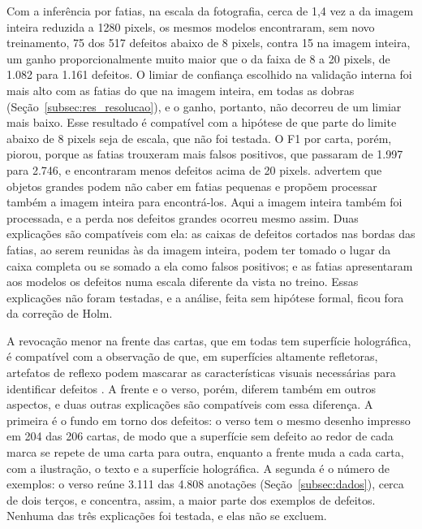 \documentclass[
    12pt,                %
    openright,           %
    oneside,             %
    a4paper,             %
    english,             %
    brazil               %
]{abntex2}
\begin{document}
Com a inferência por fatias, na escala da fotografia, cerca de 1,4 vez
a da imagem inteira reduzida a 1280 pixels, os mesmos modelos
encontraram, sem novo treinamento, 75 dos 517 defeitos abaixo de 8
pixels, contra 15 na imagem inteira, um ganho proporcionalmente muito
maior que o da faixa de 8 a 20 pixels, de 1.082 para 1.161 defeitos. O
limiar de confiança escolhido na validação interna foi mais alto com as
fatias do que na imagem inteira, em todas as dobras
(Seção~\ref{subsec:res_resolucao}), e o ganho, portanto, não decorreu
de um limiar mais baixo. Esse resultado é compatível com a hipótese de
que parte do limite abaixo de 8 pixels seja de escala, que não foi
testada. O F1 por carta, porém, piorou, porque as fatias trouxeram
mais falsos positivos, que passaram de 1.997 para 2.746, e encontraram
menos defeitos acima de 20 pixels.
 advertem que objetos grandes podem não caber em
fatias pequenas e propõem processar também a imagem inteira para
encontrá-los. Aqui a imagem inteira também foi processada, e a perda
nos defeitos grandes ocorreu mesmo assim. Duas explicações são
compatíveis com ela: as caixas de defeitos cortados nas bordas das
fatias, ao serem reunidas às da imagem inteira, podem ter tomado o
lugar da caixa completa ou se somado a ela como falsos positivos; e as
fatias apresentaram aos modelos os defeitos numa escala diferente da
vista no treino. Essas
explicações não foram testadas, e a análise, feita sem hipótese
formal, ficou fora da correção de Holm.

A revocação menor na frente das cartas, que em todas tem superfície
holográfica, é compatível com a observação de que, em superfícies
altamente refletoras, artefatos de reflexo podem mascarar as
características visuais necessárias para identificar defeitos
\cite{KimMG2026}. A frente e o verso, porém, diferem também em outros
aspectos, e duas outras explicações são compatíveis com essa
diferença. A primeira é o fundo em torno dos defeitos: o verso tem o
mesmo desenho impresso em 204 das 206 cartas, de modo que a superfície sem
defeito ao redor de cada marca se repete de uma carta para outra,
enquanto a frente muda a cada carta, com a ilustração, o texto e a
superfície holográfica. A segunda é o número de exemplos: o verso reúne
3.111 das 4.808 anotações (Seção~\ref{subsec:dados}), cerca de dois
terços, e concentra, assim, a maior parte dos exemplos de defeitos. Nenhuma das três explicações foi testada, e elas não se
excluem.
\end{document}
